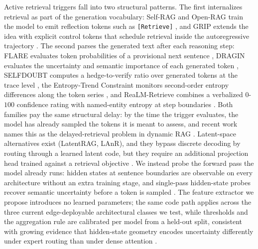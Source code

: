 \documentclass[11pt]{article}
\begin{document}
Active retrieval triggers fall into two structural patterns. The first internalizes retrieval as part of the generation vocabulary: Self-RAG and Open-RAG train the model to emit reflection tokens such as \texttt{[Retrieve]} \cite{Asai_SelfRAGLearning,Islam_OpenRAGEnhanced}, and GRIP extends the idea with explicit control tokens that schedule retrieval inside the autoregressive trajectory \cite{Li_RetrievalGenerationUnified}. The second parses the generated text after each reasoning step: FLARE evaluates token probabilities of a provisional next sentence \cite{Jiang_ActiveRetrievalAugmented}, DRAGIN evaluates the uncertainty and semantic importance of each generated token \cite{Su_DRAGINDynamicRetrieval}, SELFDOUBT computes a hedge-to-verify ratio over generated tokens at the trace level \cite{Pandey_SELFDOUBTUncertainty}, the Entropy-Trend Constraint monitors second-order entropy differences along the token series \cite{Li_ModelingUncertaintyTrends}, and ReaLM-Retrieve combines a verbalized $0$-$100$ confidence rating with named-entity entropy at step boundaries \cite{Guo_WhenRetrieveAdaptive}.%
 Both families pay the same structural delay: by the time the trigger evaluates, the model has already sampled the tokens it is meant to assess, and recent work names this as the delayed-retrieval problem in dynamic RAG \cite{Li_ModelingUncertaintyTrends}. Latent-space alternatives exist (LatentRAG, LAnR), and they bypass discrete decoding by routing through a learned latent code, but they require an additional projection head trained against a retrieval objective \cite{Zheng_LatentRAGLatent,T_LatentAbstractionRetrieval}. We instead probe the forward pass the model already runs: hidden states at sentence boundaries are observable on every architecture without an extra training stage, and single-pass hidden-state probes recover semantic uncertainty before a token is sampled \cite{Kossen_SemanticEntropyProbes,Chen_INSIDELLMsInternal}. The feature extractor we propose introduces no learned parameters; the same code path applies across the three current edge-deployable architectural classes we test, while thresholds and the aggregation rule are calibrated per model from a held-out split, consistent with growing evidence that hidden-state geometry encodes uncertainty differently under expert routing than under dense attention \cite{Atkinson_TetheredReasoningDecoupling}.
\end{document}
